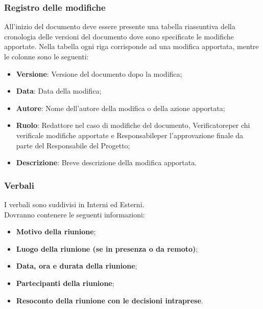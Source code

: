 \subsubsection{Registro delle modifiche}\label{Registro}
All’inizio del documento deve essere presente una tabella riassuntiva della cronologia delle versioni del documento dove sono specificate le modifiche apportate.
Nella tabella ogni riga corrisponde ad una modifica apportata, mentre le colonne sono le seguenti:
\begin{itemize}
    \item \textbf{Versione}: Versione del documento dopo la modifica;
    \item \textbf{Data}: Data della modifica;
    \item \textbf{Autore}: Nome dell’autore della modifica o della azione apportata;
    \item \textbf{Ruolo}: Redattore nel caso di modifiche del documento, Verificatore\glo per chi verifica\glo le modifiche apportate e Responsabile\glo per l’approvazione finale da parte del Responsabile del Progetto;
    \item \textbf{Descrizione}: Breve descrizione della modifica apportata.
\end{itemize}

\subsubsection{Verbali}\label{Verbali}
I verbali sono suddivisi in Interni ed Esterni.\\
Dovranno contenere le seguenti informazioni:
\begin{itemize}
    \item \textbf{Motivo della riunione};
    \item \textbf{Luogo della riunione (se in presenza o da remoto)};
    \item \textbf{Data, ora e durata della riunione};
    \item \textbf{Partecipanti della riunione};
    \item \textbf{Resoconto della riunione con le decisioni intraprese}.
\end{itemize}

